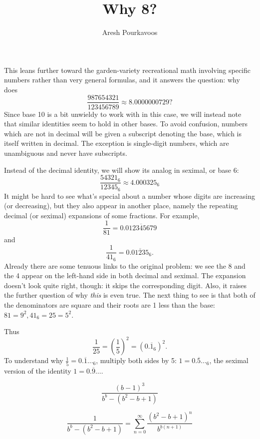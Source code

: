 \documentclass{article}
\begin{document}
\title{Why 8?}
\author{Aresh Pourkavoos}
\maketitle

This leans further toward the garden-variety recreational math
involving specific numbers rather than very general formulas,
and it answers the question: why does
\[\frac{987654321}{123456789} \approx 8.0000000729?\]
Since base 10 is a bit unwieldy to work with in this case,
we will instead note that similar identities seem to hold in other bases.
To avoid confusion, numbers which are not in decimal
will be given a subscript denoting the base,
which is itself written in decimal.
The exception is single-digit numbers, which are unambiguous
and never have subscripts.

Instead of the decimal identity,
we will show its analog in seximal, or base 6:
\[\frac{54321_6}{12345_6} \approx 4.000325_6\]
It might be hard to see what's special
about a number whose digits are increasing (or decreasing),
but they also appear in another place,
namely the repeating decimal (or seximal) expansions of some fractions.
For example,
\[\frac{1}{81} = 0.\overline{012345679}\]
and
\[\frac{1}{41_6} = 0.\overline{01235}_6.\]
Already there are some tenuous links to the original problem:
we see the 8 and the 4 appear on the left-hand side
in both decimal and seximal.
The expansion doesn't look quite right, though:
it skips the corresponding digit.
Also, it raises the further question
of why \textit{this} is even true.
The next thing to see is that both of the denominators are square
and their roots are 1 less than the base:
$81=9^2, 41_6=25=5^2$.

Thus
\[\frac{1}{25}=\left(\frac{1}{5}\right)^2=(0.\overline{1}_6)^2.\]
To understand why $\frac{1}{5}=0.\overline{1}\ldots_6$,
multiply both sides by 5:
$1=0.\overline{5}\ldots_6$,
the seximal version of the identity $1=0.\overline{9}\ldots$.

\[\frac{(b-1)^3}{b^b-(b^2-b+1)}\]

\[\frac{1}{b^b-(b^2-b+1)} = \sum_{n=0}^\infty \frac{(b^2-b+1)^n}{b^{b(n+1)}} \]
\end{document}
